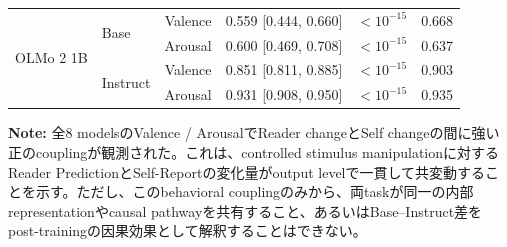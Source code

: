 \begin{table}[htbp]
\begin{tabular}{ll cccc}
\midrule
\multirow{4}{*}{OLMo 2 1B} & \multirow{2}{*}{Base} & Valence    & 0.559 [0.444, 0.660] & $<10^{-15}$ & 0.668 \\
                       &                      & Arousal    & 0.600 [0.469, 0.708] & $<10^{-15}$ & 0.637 \\
\cmidrule(lr){2-6}
                       & \multirow{2}{*}{Instruct} & Valence    & 0.851 [0.811, 0.885] & $<10^{-15}$ & 0.903 \\
                       &                      & Arousal    & 0.931 [0.908, 0.950] & $<10^{-15}$ & 0.935 \\
\bottomrule
\end{tabular}
\vspace{1ex}
\begin{minipage}{\linewidth}
\footnotesize
\textbf{Note:} 全8 modelsのValence / ArousalでReader changeとSelf changeの間に強い正のcouplingが観測された。これは、controlled stimulus manipulationに対するReader PredictionとSelf-Reportの変化量がoutput levelで一貫して共変動することを示す。ただし、このbehavioral couplingのみから、両taskが同一の内部representationやcausal pathwayを共有すること、あるいはBase--Instruct差をpost-trainingの因果効果として解釈することはできない。
\end{minipage}
\end{table}
